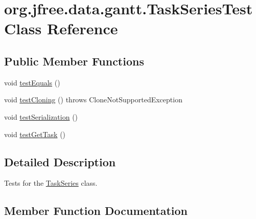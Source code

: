 \hypertarget{classorg_1_1jfree_1_1data_1_1gantt_1_1_task_series_test}{}\section{org.\+jfree.\+data.\+gantt.\+Task\+Series\+Test Class Reference}
\label{classorg_1_1jfree_1_1data_1_1gantt_1_1_task_series_test}
\subsection*{Public Member Functions}
\begin{DoxyCompactItemize}
\item 
void \mbox{\hyperlink{classorg_1_1jfree_1_1data_1_1gantt_1_1_task_series_test_a5454dc3c3cce82e03bd9d0835fb52320}{test\+Equals}} ()
\item 
void \mbox{\hyperlink{classorg_1_1jfree_1_1data_1_1gantt_1_1_task_series_test_a1a4c7e89bb981db99aea9e54b0dbbd31}{test\+Cloning}} ()  throws Clone\+Not\+Supported\+Exception 
\item 
void \mbox{\hyperlink{classorg_1_1jfree_1_1data_1_1gantt_1_1_task_series_test_a295098d5da9d21b0905b164f8c8086f5}{test\+Serialization}} ()
\item 
void \mbox{\hyperlink{classorg_1_1jfree_1_1data_1_1gantt_1_1_task_series_test_a932f591a3b8300c282d1225072b504e4}{test\+Get\+Task}} ()
\end{DoxyCompactItemize}


\subsection{Detailed Description}
Tests for the \mbox{\hyperlink{classorg_1_1jfree_1_1data_1_1gantt_1_1_task_series}{Task\+Series}} class. 

\subsection{Member Function Documentation}
\mbox{\label{classorg_1_1jfree_1_1data_1_1gantt_1_1_task_series_test_a1a4c7e89bb981db99aea9e54b0dbbd31}} 
